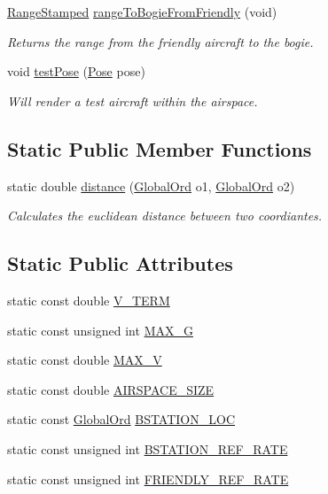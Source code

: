 \begin{DoxyCompactItemize}
\hyperlink{structRangeStamped}{Range\+Stamped} \hyperlink{classSimulator_aa41aef7b8b1e79876dd5d05aef1376ae}{range\+To\+Bogie\+From\+Friendly} (void)
\begin{DoxyCompactList}\small\item\em Returns the range from the friendly aircraft to the bogie. \end{DoxyCompactList}\item 
void \hyperlink{classSimulator_a29cf802d6785897f2e5c134a7f440398}{test\+Pose} (\hyperlink{structPose}{Pose} pose)
\begin{DoxyCompactList}\small\item\em Will render a test aircraft within the airspace. \end{DoxyCompactList}\end{DoxyCompactItemize}
\subsection*{Static Public Member Functions}
\begin{DoxyCompactItemize}
\item 
static double \hyperlink{classSimulator_a1f33cdccada9c6cf034b9cf9d94e3d1e}{distance} (\hyperlink{structGlobalOrd}{Global\+Ord} o1, \hyperlink{structGlobalOrd}{Global\+Ord} o2)
\begin{DoxyCompactList}\small\item\em Calculates the euclidean distance between two coordiantes. \end{DoxyCompactList}\end{DoxyCompactItemize}
\subsection*{Static Public Attributes}
\begin{DoxyCompactItemize}
\item 
static const double \hyperlink{classSimulator_ad903010cfc404794ecfbb2f8903b15ae}{V\+\_\+\+T\+E\+RM}
\item 
static const unsigned int \hyperlink{classSimulator_a798658490c9deedf3eeb62278308d2b3}{M\+A\+X\+\_\+G}
\item 
static const double \hyperlink{classSimulator_ad97409c332a5e261056ee47b84ba5e72}{M\+A\+X\+\_\+V}
\item 
static const double \hyperlink{classSimulator_af702e54e90c0fecb27f270890d41442c}{A\+I\+R\+S\+P\+A\+C\+E\+\_\+\+S\+I\+ZE}
\item 
static const \hyperlink{structGlobalOrd}{Global\+Ord} \hyperlink{classSimulator_a4a32de8a20938532139a6746499d7285}{B\+S\+T\+A\+T\+I\+O\+N\+\_\+\+L\+OC}
\item 
static const unsigned int \hyperlink{classSimulator_a901e2a4bee11e07d7276857f95e88f50}{B\+S\+T\+A\+T\+I\+O\+N\+\_\+\+R\+E\+F\+\_\+\+R\+A\+TE}
\item 
static const unsigned int \hyperlink{classSimulator_a6ed76930f7f1efb8396ffd05189ed000}{F\+R\+I\+E\+N\+D\+L\+Y\+\_\+\+R\+E\+F\+\_\+\+R\+A\+TE}
\end{DoxyCompactItemize}


